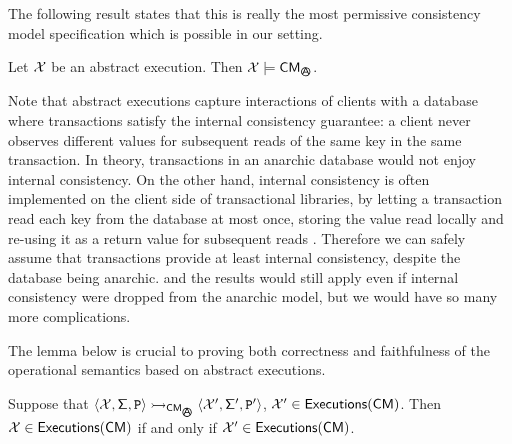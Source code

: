 The following result states that this is really the most permissive consistency model specification which is 
possible in our setting. 
\begin{proposition}
Let $\mathcal{X}$ be an abstract execution. Then $\aexec \models \CM_{\anarchicsmall}$.
\end{proposition}

Note that abstract executions capture interactions of clients with a database where 
transactions satisfy the
internal consistency guarantee: a client never observes different values for subsequent 
reads of the same key in the same transaction. In theory, transactions in an anarchic database 
would not enjoy internal consistency. On the other hand, internal consistency is often implemented 
on the client side of transactional libraries, by letting a transaction read each key from the database 
at most once, storing the value read locally and re-using it as a return value for subsequent reads 
\cite{jessy,physicsNMSI}. Therefore we can safely assume that transactions provide at least internal 
consistency, despite the database being anarchic. \ac{and the results would still apply even if 
internal consistency were dropped from the anarchic model, but we would have so many more 
complications.}

The lemma below is crucial to proving both correctness and faithfulness of the operational 
semantics based on abstract executions.

\begin{lemma}
Suppose that $\langle \aexec, \thdstackFun, \prog \rangle \absrightarrow_{\CM_{\anarchicsmall}}\langle \aexec', \thdstackFun', 
\prog' \rangle$, $\mathcal{X}' \in {\mathsf{Executions}}(\mathsf{CM})$. Then $\mathcal{X} \in {\mathsf{Executions}}(\mathsf{CM})$ if and only if $\mathcal{X}' \in {\mathsf{Executions}}(\mathsf{CM})$.
\end{lemma}

